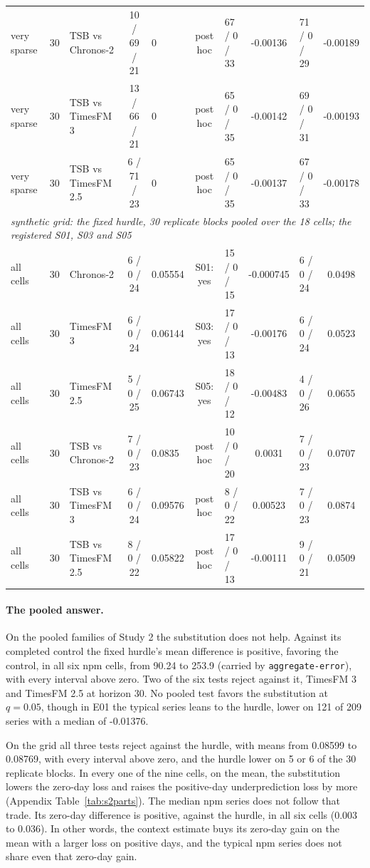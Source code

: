 \begin{table}[p]
\begin{tabular}{lrlclclclc}
very sparse & 30 & TSB vs Chronos-2 & 10 / 69 / 21 & 0 & post hoc & 67 / 0 / 33 & -0.00136 & 71 / 0 / 29 & -0.00189 \\
very sparse & 30 & TSB vs TimesFM 3 & 13 / 66 / 21 & 0 & post hoc & 65 / 0 / 35 & -0.00142 & 69 / 0 / 31 & -0.00193 \\
very sparse & 30 & TSB vs TimesFM 2.5 & 6 / 71 / 23 & 0 & post hoc & 65 / 0 / 35 & -0.00137 & 67 / 0 / 33 & -0.00178 \\
\midrule
\multicolumn{10}{l}{\emph{synthetic grid: the fixed hurdle, 30 replicate blocks pooled over the 18 cells; the registered S01, S03 and S05}} \\
all cells & 30 & Chronos-2 & 6 / 0 / 24 & 0.05554 & S01: yes & 15 / 0 / 15 & -0.000745 & 6 / 0 / 24 & 0.0498 \\
all cells & 30 & TimesFM 3 & 6 / 0 / 24 & 0.06144 & S03: yes & 17 / 0 / 13 & -0.00176 & 6 / 0 / 24 & 0.0523 \\
all cells & 30 & TimesFM 2.5 & 5 / 0 / 25 & 0.06743 & S05: yes & 18 / 0 / 12 & -0.00483 & 4 / 0 / 26 & 0.0655 \\
all cells & 30 & TSB vs Chronos-2 & 7 / 0 / 23 & 0.0835 & post hoc & 10 / 0 / 20 & 0.0031 & 7 / 0 / 23 & 0.0707 \\
all cells & 30 & TSB vs TimesFM 3 & 6 / 0 / 24 & 0.09576 & post hoc & 8 / 0 / 22 & 0.00523 & 7 / 0 / 23 & 0.0874 \\
all cells & 30 & TSB vs TimesFM 2.5 & 8 / 0 / 22 & 0.05822 & post hoc & 17 / 0 / 13 & -0.00111 & 9 / 0 / 21 & 0.0509 \\
\bottomrule
\end{tabular}
\end{table}

\paragraph{The pooled answer.} On the pooled families of Study 2 the substitution does not help. Against its
completed control the fixed hurdle's mean difference is positive, favoring the control, in all six npm cells,
from 90.24 to 253.9 (carried by \texttt{aggregate-error}), with every interval above zero. Two of the six
tests reject against it, TimesFM 3 and TimesFM 2.5 at horizon 30. No pooled test favors the substitution at $q
= 0.05$, though in E01 the typical series leans to the hurdle, lower on 121 of 209 series with a median of
-0.01376.

On the grid all three tests reject against the hurdle, with means from 0.08599 to 0.08769, with every interval
above zero, and the hurdle lower on 5 or 6 of the 30 replicate blocks. In every one of the nine cells, on the
mean, the substitution lowers the zero-day loss and raises the positive-day underprediction loss by more
(Appendix Table~\ref{tab:s2parts}). The median npm series does not follow that trade. Its zero-day difference
is positive, against the hurdle, in all six cells (0.003 to 0.036). In other words, the context estimate buys
its zero-day gain on the mean with a larger loss on positive days, and the typical npm series does not share
even that zero-day gain.

